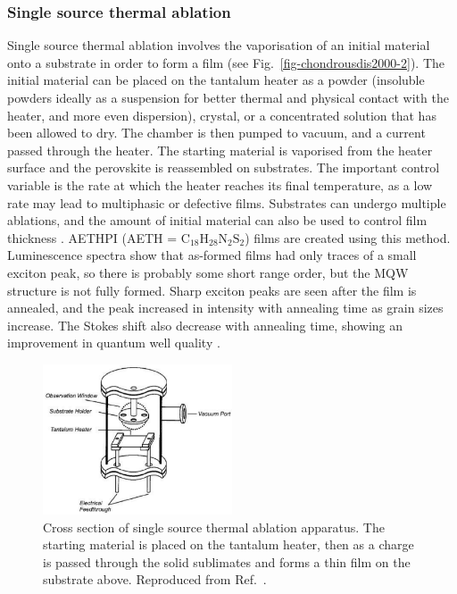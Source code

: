 \subsubsection{Single source thermal ablation}
Single source thermal ablation involves the vaporisation of an initial material onto a substrate in order to form a film (see Fig.\ \ref{fig-chondrousdis2000-2}). The initial material can be placed on the tantalum heater as a powder (insoluble powders ideally as a suspension for better thermal and physical contact with the heater, and more even dispersion), crystal, or a concentrated solution that has been allowed to dry. The chamber is then pumped to vacuum, and a current passed through the heater. The starting material is vaporised from the heater surface and the perovskite is reassembled on substrates. The important control variable is the rate at which the heater reaches its final temperature, as a low rate may lead to multiphasic or defective films. Substrates can undergo multiple ablations, and the amount of initial material can also be used to control film thickness \cite{Mitzi1999}. AETHPI (AETH = $\textrm{C}_{18}\textrm{H}_{28}\textrm{N}_2\textrm{S}_2$) films are created using this method. Luminescence spectra show that as-formed films had only traces of a small exciton peak, so there is probably some short range order, but the MQW structure is not fully formed. Sharp exciton peaks are seen after the film is annealed, and the peak increased in intensity with annealing time as grain sizes increase. The Stokes shift also decrease with annealing time, showing an improvement in quantum well quality \cite{Chondroudis2000}.

\begin{figure} [ht]
\centering
\includegraphics[width=0.5\textwidth]{Fig9}
\caption{Cross section of single source thermal ablation apparatus. The starting material is placed on the tantalum heater, then as a charge is passed through the solid sublimates and forms a thin film on the substrate above. Reproduced from Ref.\ \cite{Chondroudis2000}.}
\label{2Fig9}
\end{figure}

